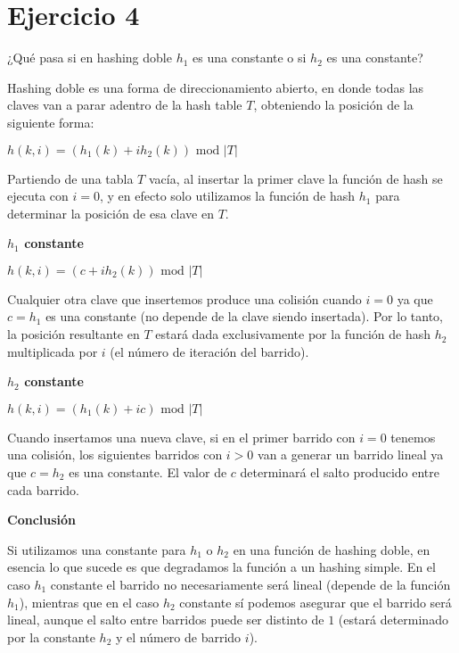 \section{Ejercicio 4}

¿Qué pasa si en hashing doble $h_1$ es una constante o si $h_2$ es una constante?

Hashing doble es una forma de direccionamiento abierto, en donde todas las claves van a parar adentro de la hash table $T$, obteniendo la posición de la siguiente forma:

$h(k, i) = (h_1(k) + i h_2(k)) \text{ mod } |T|$

Partiendo de una tabla $T$ vacía, al insertar la primer clave la función de hash se ejecuta con $i=0$, y en efecto solo utilizamos la función de hash $h_1$ para determinar la posición de esa clave en $T$.

\textbf{$h_1$ constante}

$h(k, i) = (c + i h_2(k)) \text{ mod } |T|$

Cualquier otra clave que insertemos produce una colisión cuando $i=0$ ya que $c = h_1$ es una constante (no depende de la clave siendo insertada). Por lo tanto, la posición resultante en $T$ estará dada exclusivamente por la función de hash $h_2$ multiplicada por $i$ (el número de iteración del barrido).

\textbf{$h_2$ constante}

$h(k, i) = (h_1(k) + ic) \text{ mod } |T|$

Cuando insertamos una nueva clave, si en el primer barrido con $i=0$ tenemos una colisión, los siguientes barridos con $i>0$ van a generar un barrido lineal ya que $c = h_2$ es una constante. El valor de $c$ determinará el salto producido entre cada barrido.

\textbf{Conclusión}

Si utilizamos una constante para $h_1$ o $h_2$ en una función de hashing doble, en esencia lo que sucede es que degradamos la función a un hashing simple. En el caso $h_1$ constante el barrido no necesariamente será lineal (depende de la función $h_1$), mientras que en el caso $h_2$ constante sí podemos asegurar que el barrido será lineal, aunque el salto entre barridos puede ser distinto de $1$ (estará determinado por la constante $h_2$ y el número de barrido $i$).
